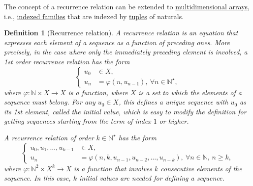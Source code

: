 \documentclass{article}
\newtheorem{definition}{Definition}
\begin{document}
The concept of a recurrence relation can be extended to \href{https://en.wikipedia.org/wiki/Multidimensional_array}{multidimensional arrays}, i.e., \href{https://en.wikipedia.org/wiki/Indexed_families}{indexed families} that are indexed by \href{https://en.wikipedia.org/wiki/Tuple}{tuples} of naturals.

\begin{definition}[Recurrence relation]
	A \emph{recurrence relation} is an equation that expresses each element of a sequence as a function of preceding ones. More precisely, in the case where only the immediately preceding element is involved, a {\rm1st order recurrence relation} has the form
	\begin{equation}
		\label{1st order recurrence relation}
		\boxed{\left\{\begin{split}
			u_0&\in X,\\
			u_n &= \varphi(n,u_{n-1}),\ \forall n\in\mathbb{N}^\star,
		\end{split}\right.}		
	\end{equation}
	where $\varphi:\mathbb{N}\times X\to X$ is a function, where $X$ is a set to which the elements of a sequence must belong. For any $u_0\in X$, this defines a unique sequence with $u_0$ as its 1st element, called the {\rm initial value}, which is easy to modify the definition for getting sequences starting from the term of index $1$ or higher.
	
	A {\rm recurrence relation of order $k\in\mathbb{N}^\star$} has the form
	\begin{equation}
		\label{kth order recurrence relation}
		\boxed{\left\{\begin{split}
			u_0,u_1,\ldots,u_{k-1}&\in X,\\
			u_n &= \varphi(n,k,u_{n-1},u_{n-2},\ldots,u_{n-k}),\ \forall n\in\mathbb{N},\,n\ge k,
		\end{split}\right.}
	\end{equation}
	where $\varphi:\mathbb{N}^2\times X^k\to X$ is a function that involves $k$ consecutive elements of the sequence. In this case, $k$ initial values are needed for defining a sequence.
\end{definition}
\end{document}
